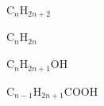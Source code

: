 \documentclass{article}
\begin{document}
\begin{center}
	C$_n$H$_{2n+2}$

	C$_n$H$_{2n}$

	C$_n$H$_{2n+1}$OH

	C$_{n-1}$H$_{2n+1}$COOH
\end{center}
\end{document}
